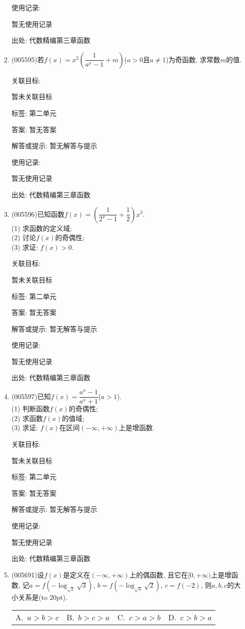 \documentclass[10pt,a4paper]{article}
\newcommand{\bracket}[1]{(\hbox to #1pt{})}
\newcommand{\fourch}[4]{\par\begin{tabular}{p{.23\textwidth}p{.23\textwidth}p{.23\textwidth}p{.23\textwidth}}
A.~#1 &B.~#2& C.~#3& D.~#4
\end{tabular}}
\begin{document}
\begin{enumerate}[1.]
使用记录:

暂无使用记录


出处: 代数精编第三章函数
\item { (005595)}若$f(x)=x^2(\dfrac 1{a^x-1}+m)$($a>0$且$a\ne 1$)为奇函数, 求常数$m$的值.


关联目标:

暂未关联目标



标签: 第二单元

答案: 暂无答案

解答或提示: 暂无解答与提示

使用记录:

暂无使用记录


出处: 代数精编第三章函数
\item { (005596)}已知函数$f(x)=(\dfrac 1{2^x-1}+\dfrac 12)x^3$.\\
(1) 求函数的定义域;\\
(2) 讨论$f(x)$的奇偶性;\\
(3) 求证: $f(x)>0$.


关联目标:

暂未关联目标



标签: 第二单元

答案: 暂无答案

解答或提示: 暂无解答与提示

使用记录:

暂无使用记录


出处: 代数精编第三章函数
\item { (005597)}已知$f(x)=\dfrac{a^x-1}{a^x+1}$($a>1$).\\
(1) 判断函数$f(x)$的奇偶性;\\
(2) 求函数$f(x)$的值域;\\
(3) 求证: $f(x)$在区间$(-\infty ,+\infty)$上是增函数.


关联目标:

暂未关联目标



标签: 第二单元

答案: 暂无答案

解答或提示: 暂无解答与提示

使用记录:

暂无使用记录


出处: 代数精编第三章函数
\item { (005691)}设$f(x)$是定义在$(-\infty ,+\infty)$上的偶函数, 且它在$[0,+\infty)$上是增函数, 记$a=f(-\log_{\sqrt 2}\sqrt 3)$, $b=f(-\log_{\sqrt 3}\sqrt 2)$, $c=f(-2)$, 则$a,b,c$的大小关系是\bracket{20}.
\fourch{$a>b>c$}{$b>c>a$}{$c>a>b$}{$c>b>a$}



\end{enumerate}
\end{document}
